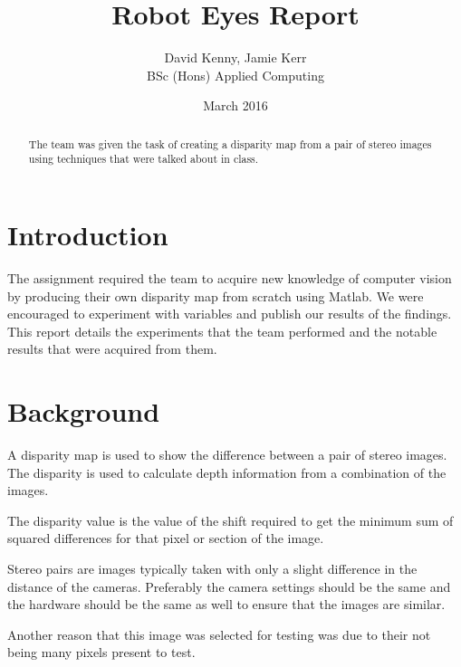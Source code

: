 \documentclass[twocolumn]{article}
\title{Robot Eyes Report}
\author{David Kenny, Jamie Kerr\\BSc (Hons) Applied Computing}
\date{March 2016}
\begin{document}
\maketitle


\begin{abstract}

The team was given the task of creating a disparity map from a pair of stereo images using techniques that were talked about in class. 

\end{abstract}


\section{Introduction}
\vspace{-1ex}

The assignment required the team to acquire new knowledge of computer vision by producing their own disparity map from scratch using Matlab. We were encouraged to experiment with variables and publish our results of the findings. This report details the experiments that the team performed and the notable results that were acquired from them. 


\section{Background}
\vspace{-1ex}

A disparity map \cite{disparitymap} is used to show the difference between a pair of stereo images. The disparity is used to calculate depth information from a combination of the images. 

The disparity value is the value of the shift required to get the minimum sum of squared differences \cite{introssd} for that pixel or section of the image. 

Stereo pairs are images typically taken with only a slight difference in the distance of the cameras. Preferably the camera settings should be the same and the hardware should be the same as well to ensure that the images are similar. 

Another reason that this image was selected for testing was due to their not being many pixels present to test.

\end{document}
